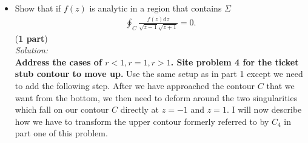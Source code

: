 \documentclass[10pt]{amsart}
\newcommand{\D}{\mathrm{d}}
\theoremstyle{nonumberplain}
\begin{document}
\begin{enumerate}[label={\bf {\arabic*}:}]
\begin{itemize}
  \item Show that if $f(z)$ is analytic in a region that contains $\Sigma$
    \begin{align*}
        \oint_C \frac{f(z) \D z}{\sqrt{z-1} \sqrt{z+1}}= 0.
      \end{align*}
(\textbf{1 part}) \\
\textit{Solution:} \\
\textbf{Address the cases of $r < 1, r=1, r>1$. Site problem 4 for the ticket stub contour to move up.}
Use the same setup as in part 1 except we need to add the following step.
After we have approached the contour $C$ that we want from the bottom, we then need to deform around the two singularities which fall on our contour $C$ directly at $z = -1$ and $z = 1$.
I will now describe how we have to transform the upper contour formerly referred to by $C_4$ in part one of this problem. \\


\end{itemize}
\end{enumerate}
\end{document}

